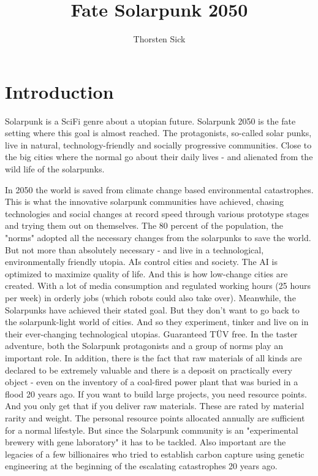 \documentclass{book}
\title{Fate Solarpunk 2050}
\author{Thorsten Sick}
\begin{document}
\chapter{Introduction}

Solarpunk is a SciFi genre about a utopian future. Solarpunk 2050 is the fate setting where this goal is almost
reached. The protagonists, so-called solar punks, live in natural, technology-friendly and socially progressive
communities. Close to the big cities where the normal go about their daily lives - and alienated from the wild life of
the solarpunks.

In 2050 the world is saved from climate change based environmental catastrophes. This is what the innovative solarpunk
communities have achieved, chasing technologies and social changes at record speed through various prototype stages
and trying them out on themselves.
The 80 percent of the population, the "norms" adopted all the necessary changes from the solarpunks to save the world. But
not more than absolutely necessary - and live in a technological, environmentally friendly utopia.
AIs control cities and society. The AI is optimized to maximize quality of life. And this is how low-change cities are
created. With a lot of media consumption and regulated working hours (25 hours per week) in orderly jobs (which robots
could also take over).
Meanwhile, the Solarpunks have achieved their stated goal. But they don't want to go back to the solarpunk-light world
of cities. And so they experiment, tinker and live on in their ever-changing technological utopias. Guaranteed TÜV free.
In the taster adventure, both the Solarpunk protagonists and a group of norms play an important role.
In addition, there is the fact that raw materials of all kinds are declared to be extremely valuable and there is a deposit
on practically every object - even on the inventory of a coal-fired power plant that was buried in a flood 20 years ago. If
you want to build large projects, you need resource points. And you only get that if you deliver raw materials. These are
rated by material rarity and weight.
The personal resource points allocated annually are sufficient for a normal lifestyle. But since the Solarpunk community
is an "experimental brewery with gene laboratory" it has to be tackled.
Also important are the legacies of a few billionaires who tried to establish carbon capture using genetic engineering at
the beginning of the escalating catastrophes 20 years ago.


\end{document}
